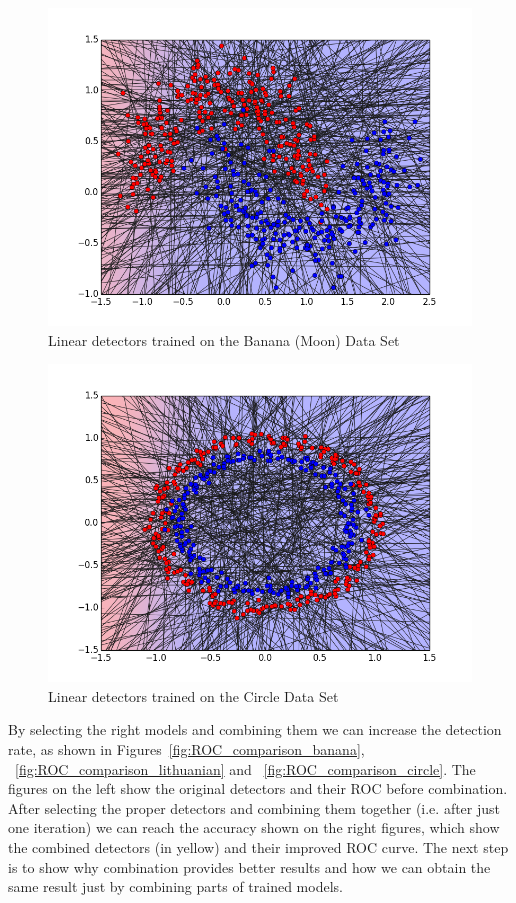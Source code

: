 \begin{figure}[H]
\centering
\includegraphics[scale=0.6]{figs/AllClassifiersBanana}
\caption{Linear detectors trained on the Banana (Moon) Data Set}
\label{Figure::banana_all}
\end{figure}

\begin{figure}[H]
\centering
\includegraphics[scale=0.6]{figs/AllClassifiersCircle}
\caption{Linear detectors trained on the Circle Data Set}
\label{Figure::circle_all}
\end{figure}

By selecting the right models and combining them  we can increase the detection rate, as shown in Figures~\ref{fig:ROC_comparison_banana}, ~\ref{fig:ROC_comparison_lithuanian} and ~\ref{fig:ROC_comparison_circle}. The figures on the left show the original detectors and their ROC before combination. After selecting the proper detectors and combining them together (i.e. after just one iteration) we can reach the accuracy shown on the right figures, which show the combined detectors (in yellow) and their improved ROC curve. The next step is to show why combination provides better results and how we can obtain the same result just by combining parts of trained models.



